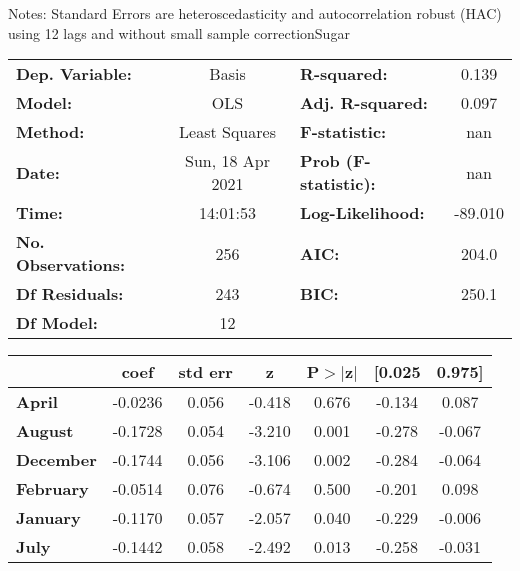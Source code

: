 Notes: \newline
 [1] Standard Errors are heteroscedasticity and autocorrelation robust (HAC) using 12 lags and without small sample correctionSugar\begin{center}
\begin{tabular}{lclc}
\toprule
\textbf{Dep. Variable:}    &      Basis       & \textbf{  R-squared:         } &     0.139   \\
\textbf{Model:}            &       OLS        & \textbf{  Adj. R-squared:    } &     0.097   \\
\textbf{Method:}           &  Least Squares   & \textbf{  F-statistic:       } &       nan   \\
\textbf{Date:}             & Sun, 18 Apr 2021 & \textbf{  Prob (F-statistic):} &      nan    \\
\textbf{Time:}             &     14:01:53     & \textbf{  Log-Likelihood:    } &   -89.010   \\
\textbf{No. Observations:} &         256      & \textbf{  AIC:               } &     204.0   \\
\textbf{Df Residuals:}     &         243      & \textbf{  BIC:               } &     250.1   \\
\textbf{Df Model:}         &          12      & \textbf{                     } &             \\
\bottomrule
\end{tabular}
\begin{tabular}{lcccccc}
                   & \textbf{coef} & \textbf{std err} & \textbf{z} & \textbf{P$> |$z$|$} & \textbf{[0.025} & \textbf{0.975]}  \\
\midrule
\textbf{April}     &      -0.0236  &        0.056     &    -0.418  &         0.676        &       -0.134    &        0.087     \\
\textbf{August}    &      -0.1728  &        0.054     &    -3.210  &         0.001        &       -0.278    &       -0.067     \\
\textbf{December}  &      -0.1744  &        0.056     &    -3.106  &         0.002        &       -0.284    &       -0.064     \\
\textbf{February}  &      -0.0514  &        0.076     &    -0.674  &         0.500        &       -0.201    &        0.098     \\
\textbf{January}   &      -0.1170  &        0.057     &    -2.057  &         0.040        &       -0.229    &       -0.006     \\
\textbf{July}      &      -0.1442  &        0.058     &    -2.492  &         0.013        &       -0.258    &       -0.031     \\

\end{tabular}
\end{center}
